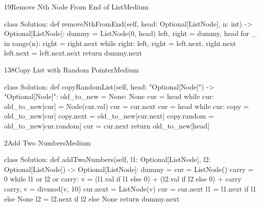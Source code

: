 \begin{problem}{19}{Remove Nth Node From End of List}{Medium}
\begin{code}
class Solution:
    def removeNthFromEnd(self, head: Optional[ListNode], n: int) -> Optional[ListNode]:
        dummy = ListNode(0, head)
        left, right = dummy, head
        for _ in range(n):
            right = right.next
        while right:
            left, right = left.next, right.next
        left.next = left.next.next
        return dummy.next
\end{code}
\end{problem}

\begin{problem}{138}{Copy List with Random Pointer}{Medium}
\begin{code}
class Solution:
    def copyRandomList(self, head: "Optional[Node]") -> "Optional[Node]":
        old_to_new = {None: None}
        cur = head
        while cur:
            old_to_new[cur] = Node(cur.val)
            cur = cur.next
        cur = head
        while cur:
            copy = old_to_new[cur]
            copy.next = old_to_new[cur.next]
            copy.random = old_to_new[cur.random]
            cur = cur.next
        return old_to_new[head]
\end{code}
\end{problem}

\begin{problem}{2}{Add Two Numbers}{Medium}
\begin{code}
class Solution:
    def addTwoNumbers(self, l1: Optional[ListNode], l2: Optional[ListNode]) -> Optional[ListNode]:
        dummy = cur = ListNode()
        carry = 0
        while l1 or l2 or carry:
            v = (l1.val if l1 else 0) + (l2.val if l2 else 0) + carry
            carry, v = divmod(v, 10)
            cur.next = ListNode(v)
            cur = cur.next
            l1 = l1.next if l1 else None
            l2 = l2.next if l2 else None
        return dummy.next
\end{code}
\end{problem}

